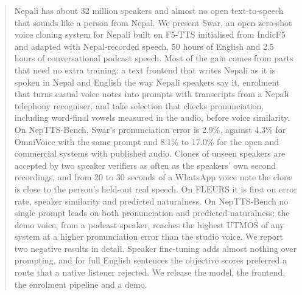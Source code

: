 \begin{abstract}
Nepali has about 32 million speakers and almost no open text-to-speech that sounds like a person from Nepal. We present Swar, an open zero-shot voice cloning system for Nepali built on F5-TTS initialised from IndicF5 and adapted with Nepal-recorded speech, 50 hours of English and 2.5 hours of conversational podcast speech. Most of the gain comes from parts that need no extra training: a text frontend that writes Nepali as it is spoken in Nepal and English the way Nepali speakers say it, enrolment that turns casual voice notes into prompts with transcripts from a Nepali telephony recogniser, and take selection that checks pronunciation, including word-final vowels measured in the audio, before voice similarity. On NepTTS-Bench, Swar's pronunciation error is 2.9\%, against 4.3\% for OmniVoice with the same prompt and 8.1\% to 17.0\% for the open and commercial systems with published audio. Clones of unseen speakers are accepted by two speaker verifiers as often as the speakers' own second recordings, and from 20 to 30 seconds of a WhatsApp voice note the clone is close to the person's held-out real speech. On FLEURS it is first on error rate, speaker similarity and predicted naturalness. On NepTTS-Bench no single prompt leads on both pronunciation and predicted naturalness: the demo voice, from a podcast speaker, reaches the highest UTMOS of any system at a higher pronunciation error than the studio voice. We report two negative results in detail. Speaker fine-tuning adds almost nothing over prompting, and for full English sentences the objective scores preferred a route that a native listener rejected. We release the model, the frontend, the enrolment pipeline and a demo.
\end{abstract}
